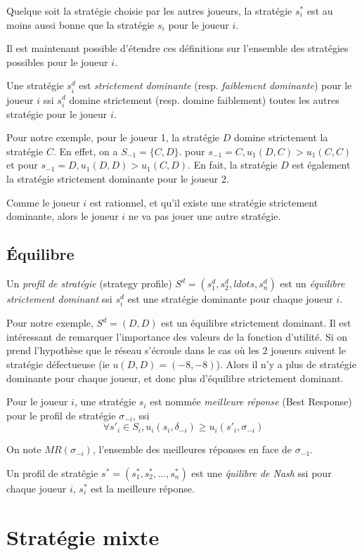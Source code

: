 Quelque soit la strat\'egie choisie par les autres joueurs, la strat\'egie $s^{*}_{i}$ est au moins aussi bonne que la strat\'egie $s_i$ pour le joueur $i$. 


Il est maintenant possible d'\'etendre ces d\'efinitions sur l'ensemble des strat\'egies possibles pour le joueur $i$.

\begin{defn}
Une strat\'egie $s^{d}_{i}$ est \emph{strictement dominante} (resp. \emph{faiblement dominante}) pour le joueur $i$ ssi $s^{d}_{i}$ domine strictement (resp. domine faiblement) toutes les autres strat\'egie pour le joueur $i$.
\end{defn}

Pour notre exemple, pour le joueur 1, la strat\'egie $D$ domine strictement la strat\'egie $C$. En effet, on a $S_{-1} = \{C, D\}$. pour $s_{-1} = {C}, u_1(D, C) > u_1(C, C)$ et pour $s_{-1} = {D}, u_1(D, D) > u_1(C, D)$. En fait, la strat\'egie $D$ est \'egalement la strat\'egie strictement dominante pour le joueur 2.

Comme le joueur $i$ est rationnel, et qu'il existe une strat\'egie strictement dominante, alors le joueur $i$ ne va pas jouer une autre strat\'egie.


\subsection{\'Equilibre}
\begin{defn}
Un \emph{profil de strat\'egie} (strategy profile) $S^{d} = (s^d_1, s^d_2, ldots, s^d_n)$ est un \emph{\'equilibre strictement dominant} ssi $s^d_i$ est une strat\'egie dominante pour chaque joueur $i$.
\end{defn}

Pour notre exemple, $S^d = (D,D)$ est un \'equilibre strictement dominant. Il est int\'eressant de remarquer l'importance des valeurs de la fonction d'utilit\'e. Si on prend l'hypoth\`ese que le r\'eseau s'\'ecroule dans le cas o\`u les 2 joueurs suivent le strat\'egie d\'efectueuse (ie $u(D,D) = (-8,-8)$). Alors il n'y a plus de strat\'egie dominante pour chaque joueur, et donc plus d'\'equilibre strictement dominant. 


\begin{defn}
Pour le joueur $i$, une strat\'egie $s_i$ est nomm\'ee \emph{meilleure r\'eponse} (Best Response) pour le profil de strat\'egie $\sigma_{-i}$, ssi 
$$\forall s'_i \in S_i, u_i(s_i, \delta_{-i}) \geq u_i(s'_i, \sigma_{-i})$$
\end{defn}

On note $MR(\sigma_{-i})$, l'ensemble des meilleures r\'eponses en face de $\sigma_{-1}$.

\begin{defn}
Un profil de strat\'egie $s^* = (s^*_1, s^*_2, \ldots, s^*_n)$ est une \emph{\'quilibre de Nash} ssi pour chaque joueur $i$, $s^*_i$ est la meilleure r\'eponse.  
\end{defn}




\section{Strat\'egie mixte}

